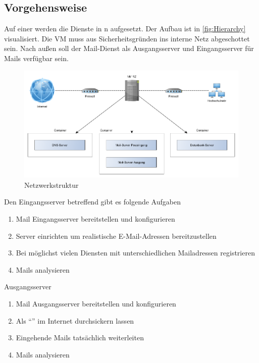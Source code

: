 \documentclass[a4paper,11pt,singlespacing]{article}
\begin{document}
	\subsection{Vorgehensweise}\label{sec:EinleitungVorgehensweise}
		Auf einer  werden die Dienste in n aufgesetzt.
		Der Aufbau ist in \autoref{fig:Hierarchy} visualisiert.
		Die VM muss aus Sicherheitsgründen ins interne Netz abgeschottet sein.
		Nach außen soll der Mail-Dienst als Ausgangsserver und Eingangsserver für Mails verfügbar sein.

		\begin{figure}[H]
		\includegraphics[width=\linewidth]{2-Hierarchy.png}
		\caption{Netzwerkstruktur}
		\label{fig:Hierarchy}
		\end{figure}

		Den Eingangsserver betreffend gibt es folgende Aufgaben %
		\begin{enumerate}
		\item Mail Eingangsserver bereitstellen und konfigurieren
		\item {} Server einrichten um realistische E-Mail-Adressen bereitzustellen
		\item Bei möglichst vielen Diensten mit unterschiedlichen Mailadressen registrieren
		\item Mails analysieren
		\end{enumerate}

		Ausgangsserver %
		\begin{enumerate}
		\item Mail Ausgangsserver bereitstellen und konfigurieren
		\item Als "`"' im Internet durchsickern lassen
		\item Eingehende Mails tatsächlich weiterleiten
		\item Mails analysieren
		\end{enumerate}
\end{document}
